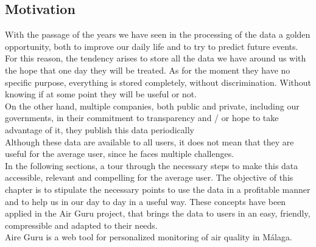 \subsection*{Motivation}

With the passage of the years we have seen in the processing of the data a golden opportunity, 
both to improve our daily life and to try to predict
future events. For this reason, the tendency arises to store all the data we have
around us with the hope that one day they will be treated.
As for the moment they have no specific purpose, everything is stored completely, without discrimination.
Without knowing if at some point they will be useful or not. \\

On the other hand, multiple companies, both public and private, including our governments, 
in their commitment to transparency and / or hope to take advantage of it, they publish this data 
periodically \\

Although these data are available to all users, it does not mean that they are useful for the 
average user, since he faces multiple challenges. \\

In the following sections, a tour through the necessary steps to make this data
accessible, relevant and compelling for the average user.
The objective of this chapter is to stipulate the necessary points to use the data in a profitable manner and
to help us in our day to day in a useful way. These concepts have been applied in the Air Guru project,
that brings the data to users in an easy, friendly, compressible and adapted to their needs. \\

Aire Guru is a web tool for personalized monitoring of air quality in Málaga.
